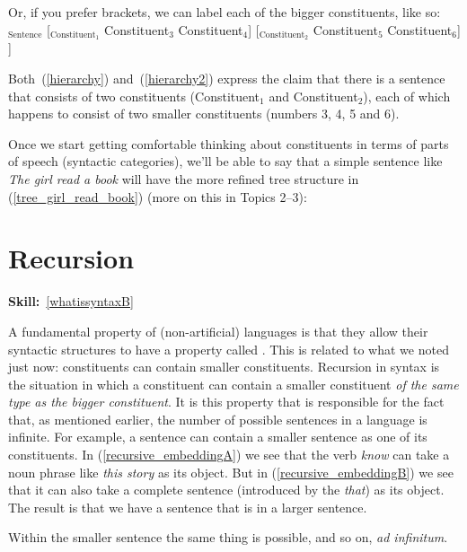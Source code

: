 \documentclass{article}
\begin{document}
Or, if you prefer brackets, we can label each of the bigger constituents, like so:
\ea {[}$_\text{Sentence}$ [$_\text{Constituent$_\text{1}$}$ Constituent$_\text{3}$ Constituent$_\text{4}$] [$_\text{Constituent$_\text{2}$}$ Constituent$_\text{5}$ Constituent$_\text{6}$] ]
    \label{hierarchy2}
\z

Both~(\ref{hierarchy}) and~(\ref{hierarchy2}) express the claim that there is a sentence that consists of two constituents (Constituent$_\text{1}$ and Constituent$_\text{2}$), each of which happens to consist of two smaller constituents (numbers 3, 4, 5 and 6).

Once we start getting comfortable thinking about constituents in terms of parts of speech (syntactic categories), we'll be able to say that a simple sentence like \emph{The girl read a book} will have the more refined tree structure in (\ref{tree_girl_read_book}) (more on this in Topics 2--3):
\begin{exe}
    \label{tree_girl_read_book}
\end{exe}


\section{Recursion}
\hfill{}\textbf{Skill:}~\ref{whatissyntaxB}

A fundamental property of  (non-artificial) languages is that they allow their syntactic structures to have a property called .
This is related to what we noted just now: constituents can contain smaller constituents. Recursion in syntax is the situation in which a constituent can contain a smaller constituent \emph{of the same type as the bigger constituent}.
It is this property that is responsible for the fact that, as mentioned earlier, the number of possible sentences in a language is infinite.
For example, a sentence can contain a smaller sentence as one of its constituents.
In (\ref{recursive_embeddingA}) we see that the verb \emph{know} can take a noun phrase like \emph{this story} as its object.
But in (\ref{recursive_embeddingB}) we see that it can also take a complete sentence (introduced by the  \emph{that}) as its object.
The result is that we have a sentence that is  in a larger sentence.
\begin{exe}
\end{exe}
Within the smaller sentence the same thing is possible, and so on, \emph{ad infinitum}.
\end{document}
